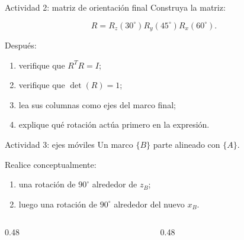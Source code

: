\documentclass[aspectratio=169,10pt]{beamer}
\begin{document}
\begin{frame}{Actividad 2: matriz de orientación final}
    \small
    Construya la matriz:

    \[
    R=R_z(30^\circ)R_y(45^\circ)R_x(60^\circ).
    \]

    Después:

    \begin{enumerate}
        \item verifique que $R^TR=I$;
        \item verifique que $\det(R)=1$;
        \item lea sus columnas como ejes del marco final;
        \item explique qué rotación actúa primero en la expresión.
    \end{enumerate}

\end{frame}

\begin{frame}{Actividad 3: ejes móviles}
    \small
    Un marco $\{B\}$ parte alineado con $\{A\}$.

    Realice conceptualmente:

    \begin{enumerate}
        \item una rotación de $90^\circ$ alrededor de $z_B$;
        \item luego una rotación de $90^\circ$ alrededor del nuevo $x_B$.
    \end{enumerate}

    \vspace{0.15cm}

    \begin{columns}[T]
        \begin{column}{0.48\textwidth}
        \end{column}
        \begin{column}{0.48\textwidth}
        \end{column}
    \end{columns}
\end{frame}
\end{document}
